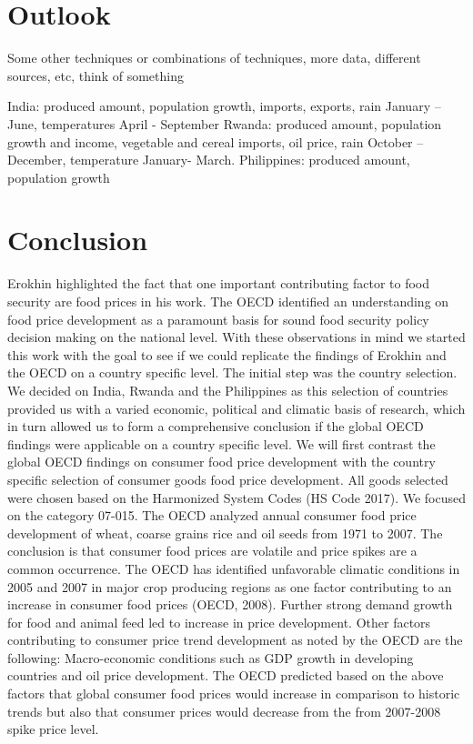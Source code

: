 \documentclass[12pt,a4paper,english]{article}
\begin{document}
\section{Outlook}

Some other techniques or combinations of techniques, more data, different sources, etc, think of something

India: produced amount, population growth, imports, exports, rain January – June, temperatures April - September
Rwanda: produced amount, population growth and income, vegetable and cereal imports, oil price, rain October – December, temperature January- March.
Philippines: produced amount, population growth

\section{Conclusion}
Erokhin highlighted the fact that one important contributing factor to food security are food prices in his work. The OECD identified an understanding on food price development as a paramount basis for sound food security policy decision making on the national level. With these observations in mind we started this work with the goal to see if we could replicate the findings of Erokhin and the OECD on a country specific level. The initial step was the country selection. We decided on India, Rwanda and the Philippines as this selection of countries provided us with a varied economic, political and climatic basis of research, which in turn allowed us to form a comprehensive conclusion if the global OECD findings were applicable on a country specific level. 
We will first contrast the global OECD findings on consumer food price development with the country specific selection of consumer goods food price development. All goods selected were chosen based on the Harmonized System Codes (HS Code 2017). We focused on the category 07-015. 
The OECD analyzed annual consumer food price development of wheat, coarse grains rice and oil seeds from 1971 to 2007. The conclusion is that consumer food prices are volatile and price spikes are a common occurrence. The OECD has identified unfavorable climatic conditions in 2005 and 2007 in major crop producing regions as one factor contributing to an increase in consumer food prices (OECD, 2008). Further strong demand growth for food and animal feed led to increase in price development. Other factors contributing to consumer price trend development as noted by the OECD are the following: Macro-economic conditions such as GDP growth in developing countries and oil price development. The OECD predicted based on the above factors that global consumer food prices would increase in comparison to historic trends but also that consumer prices would decrease from the from 2007-2008 spike price level. 
\end{document}
